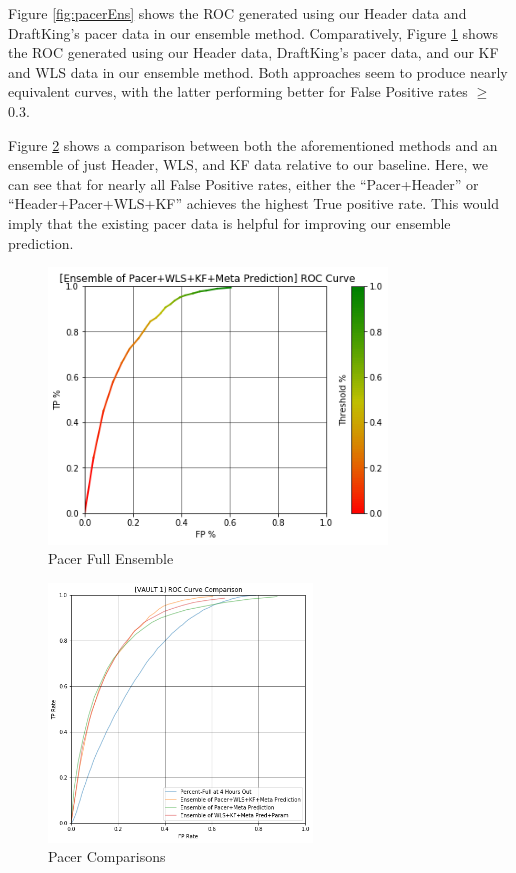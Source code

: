 Figure \ref{fig:pacerEns} shows the ROC generated using our Header data and DraftKing's pacer data in our ensemble method. Comparatively, Figure \ref{fig:pacerFullEns} shows the ROC generated using our Header data, DraftKing's pacer data, and our KF and WLS data in our ensemble method. Both approaches seem to produce nearly equivalent curves, with the latter performing better for False Positive rates $\geq$ 0.3.

Figure \ref{fig:pacerComp} shows a comparison between both the aforementioned methods and an ensemble of just Header, WLS, and KF data relative to our baseline. Here, we can see that for nearly all False Positive rates, either the ``Pacer+Header'' or ``Header+Pacer+WLS+KF'' achieves the highest True positive rate. This would imply that the existing pacer data is helpful for improving our ensemble prediction.

\pagebreak

\begin{figure}[h]
\centering
\includegraphics[width=9cm]{body/results/Graphs/PacerStuff/EnsemblePacerMetaWLSKF.png}
\caption{Pacer Full Ensemble}
\label{fig:pacerFullEns}
\end{figure}

\begin{figure}[h]
\centering
\includegraphics[width=7cm]{body/results/Graphs/PacerStuff/Compare.png}
\caption{Pacer Comparisons}
\label{fig:pacerComp}
\end{figure}

\pagebreak